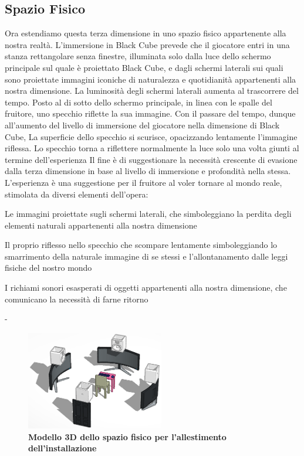 	\subsection{Spazio Fisico}
	Ora estendiamo questa terza dimensione in uno spazio fisico appartenente alla nostra realtà. L'immersione in Black Cube prevede che il giocatore entri in una stanza rettangolare senza finestre, illuminata solo dalla luce dello schermo principale sul quale è proiettato Black Cube, e dagli schermi laterali sui quali sono proiettate immagini iconiche di naturalezza e quotidianità appartenenti alla nostra dimensione. La luminosità degli schermi laterali aumenta al trascorrere del tempo.
	Posto al di sotto dello schermo principale, in linea con le spalle del fruitore, uno specchio riflette la sua immagine. Con il passare del tempo, dunque all'aumento del livello di immersione del giocatore nella dimensione di Black Cube, La superficie dello specchio si scurisce, opacizzando lentamente l'immagine riflessa. Lo specchio torna a riflettere normalmente la luce solo una volta giunti al termine dell'esperienza
	Il fine è di suggestionare la necessità crescente di evasione dalla terza dimensione in base al livello di immersione e profondità nella stessa. L'esperienza è una suggestione per il fruitore al voler tornare al mondo reale, stimolata da diversi elementi dell'opera:
	\begin{compactitem}
		\item Le immagini proiettate sugli schermi laterali, che simboleggiano la perdita degli elementi naturali appartenenti alla nostra dimensione
		\item Il proprio riflesso nello specchio che scompare lentamente simboleggiando lo smarrimento della naturale immagine di se stessi e l'allontanamento dalle leggi fisiche del nostro mondo
		\item I richiami sonori esasperati di oggetti appartenenti alla nostra dimensione, che comunicano la necessità di farne ritorno
	\end{compactitem}

\newpage
-
\vspace{8cm}

	\begin{figure}[h]
		\begin{center}
			\includegraphics[width=6cm]{img/image1.png}
			\caption{\textbf{Modello 3D dello spazio fisico per l'allestimento dell'installazione}}
			\label{gr01}
		\end{center}
	\end{figure}

